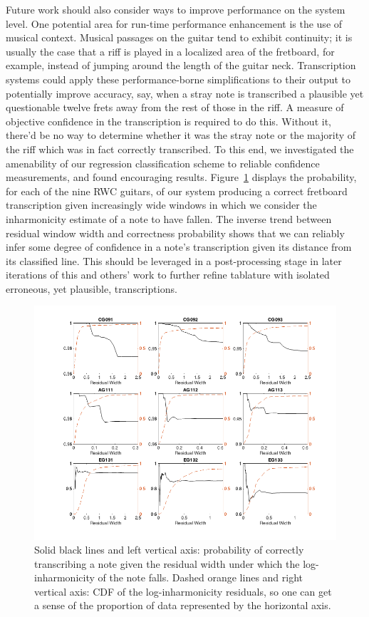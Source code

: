 \documentclass[12pt]{cmuthesis}
\begin{document}
Future work should also consider ways to improve performance on the system level. One potential area for run-time performance enhancement is the use of musical context. Musical passages on the guitar tend to exhibit continuity; it is usually the case that a riff is played in a localized area of the fretboard, for example, instead of jumping around the length of the guitar neck. Transcription systems could apply these performance-borne simplifications to their output to potentially improve accuracy, say, when a stray note is transcribed a plausible yet questionable twelve frets away from the rest of those in the riff. A measure of objective confidence in the transcription is required to do this. Without it, there'd be no way to determine whether it was the stray note or the majority of the riff which was in fact correctly transcribed. To this end, we investigated the amenability of our regression classification scheme to reliable confidence measurements, and found encouraging results. Figure~\ref{fig:p-correct-res} displays the probability, for each of the nine RWC guitars, of our system producing a correct fretboard transcription given increasingly wide windows in which we consider the inharmonicity estimate of a note to have fallen. The inverse trend between residual window width and correctness probability shows that we can reliably infer some degree of confidence in a note's transcription given its distance from its classified line. This should be leveraged in a post-processing stage in later iterations of this and others' work to further refine tablature with isolated erroneous, yet plausible, transcriptions.

\begin{figure}[!htbp] 
\centering
\includegraphics[angle=90,scale=0.65]{p-correct-res}
\caption{Solid black lines and left vertical axis: probability of correctly transcribing a note given the residual width under which the log-inharmonicity of the note falls. Dashed orange lines and right vertical axis: CDF of the log-inharmonicity residuals, so one can get a sense of the proportion of data represented by the horizontal axis.}
\label{fig:p-correct-res}
\end{figure} 
\end{document}
